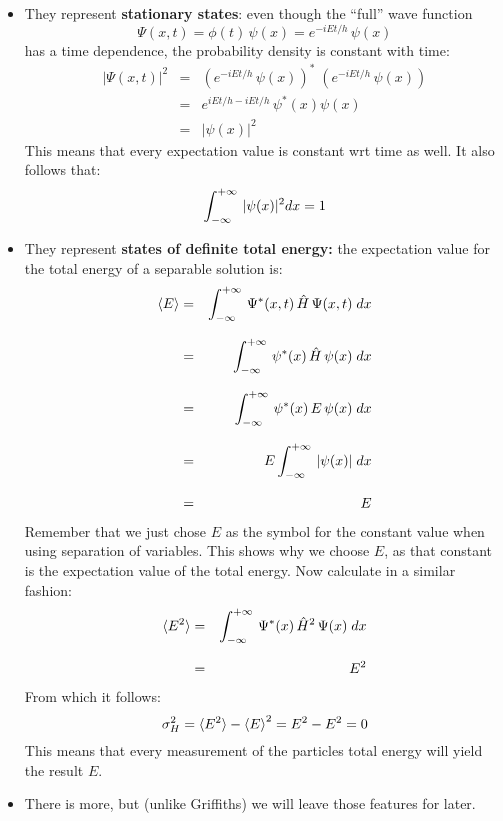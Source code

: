 \documentclass[12pt]{book}
\begin{document}
\begin{itemize}
\item They represent {\bf stationary states}:  even though the ``full'' wave function
\begin{equation*}
\Psi(x,t) = \phi(t) \, \psi(x) = e^{-iEt/h} \, \psi(x)
\end{equation*}
has a time dependence, the probability density is constant with time:
\begin{eqnarray*}
|\Psi(x,t)|^2 &=& \left(e^{-iEt/h} \, \psi(x)\right)^* \; \left(e^{-iEt/h} \, \psi(x)\right)\\[8pt]
&=& e^{iEt/h-iEt/h} \, \psi^*(x) \psi(x)\\[8pt]
&=& | \psi(x) |^2
\end{eqnarray*}
This means that every expectation value is constant wrt time as well.  It also follows that:
\begin{equation*}
\int_{-\infty}^{+\infty}\, |\psi(x)|^2 dx = 1\\
\end{equation*}
\item They represent {\bf states of definite total energy:} the expectation value for the total energy of a separable solution is:
\begin{eqnarray*}
\braket{E} &=& \int_{-\infty}^{+\infty}\, \Psi^*(x,t) \, \hat{H} \, \Psi(x,t) \; dx \\[8pt]
           &=& \int_{-\infty}^{+\infty}\, \psi^*(x) \, \hat{H} \, \psi(x) \; dx \\[8pt]
           &=& \int_{-\infty}^{+\infty}\, \psi^*(x) \, E \, \psi(x) \; dx \\[8pt]
           &=& E \int_{-\infty}^{+\infty}\, |\psi(x)| \; dx \\[8pt]
           &=& E           
\end{eqnarray*}
Remember that we just chose $E$ as the symbol for the constant value when using separation of variables.  This shows why we choose $E$, as that constant is the expectation value of the total energy.  Now calculate in a similar fashion:
\begin{eqnarray*}
\braket{E^2} &=& \int_{-\infty}^{+\infty}\, \Psi^*(x) \, \hat{H}^2 \, \Psi(x) \; dx \\[8pt]
           &=& E^2
\end{eqnarray*}
From which it follows:
\begin{equation*}
\sigma^2_H = \braket{E^2} - \braket{E}^2 = E^2 - E^2 = 0
\end{equation*}
This means that every measurement of the particles total energy will yield the result $E$.
\item There is more, but (unlike Griffiths) we will leave those features for later.
\end{itemize}
\end{document}
